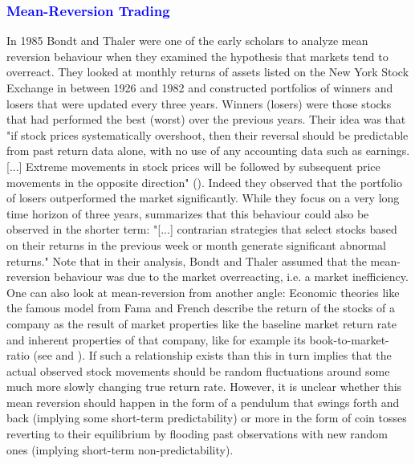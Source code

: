 \subsubsection{\textcolor{blue}{Mean-Reversion Trading}}
In 1985 Bondt and Thaler \citet{bondt_does_1985} were one of the early scholars to analyze mean reversion behaviour when they examined the hypothesis that markets tend to overreact. They looked at monthly returns of assets listed on the New York Stock Exchange in between 1926 and 1982 and constructed portfolios  of winners and losers that were updated every three years. Winners (losers) were those stocks that had performed the best (worst) over the previous years. Their idea was that "if stock prices systematically overshoot, then their reversal should be predictable from past return data alone, with no use of any accounting data such as earnings. [...] Extreme movements in stock prices will be followed by subsequent price movements in the opposite direction" (\cite{bondt_does_1985}). Indeed they observed that the portfolio of losers outperformed the market significantly. While they focus on a very long time horizon of three years, \citep{jegadeesh_returns_1993} summarizes that this behaviour could also be observed in the shorter term: "[...] contrarian strategies that select stocks based on their returns in the previous week or month generate significant abnormal returns." Note that in their analysis, Bondt and Thaler assumed that the mean-reversion behaviour was due to the market overreacting, i.e. a market inefficiency. One can also look at mean-reversion from another angle: Economic theories like the famous model from Fama and French describe the return of the stocks of a company as the result of market properties like the baseline market return rate and inherent properties of that company, like for example its book-to-market-ratio  (see \citet{fama_cross-section_1992} and \citet{fama_common_1993}). If such a relationship exists than this in turn implies that the actual observed stock movements should be random fluctuations around some much more slowly changing true return rate. However, it is unclear whether this mean reversion should happen in the form of a pendulum that swings forth and back (implying some short-term predictability) or more in the form of coin tosses reverting to their equilibrium by flooding past observations with new random ones (implying short-term non-predictability). 

